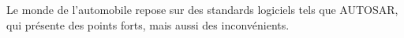 Le monde de l'automobile repose sur des standards logiciels tels que AUTOSAR, qui présente des points forts, mais aussi des inconvénients.




